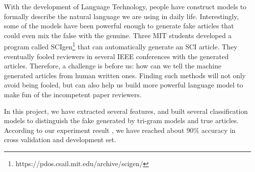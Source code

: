 With the development of Language Technology, people have construct models to formally describe the natural language we are using in daily life.
Interestingly, some of the models have been powerful enough to generate fake articles that could even mix the false with the genuine.
Three MIT students developed a program called SCIgen\footnote{https://pdos.csail.mit.edu/archive/scigen/} that can automatically
generate an SCI article. They eventually fooled reviewers in several IEEE conferences with the generated articles. Therefore, a challenge is before
us: how can we tell the machine generated articles from human written ones. Finding such methods will not only avoid being fooled, but
can also help us build more powerful language model to make fun of the incompetent paper reviewers. 

In this project, we have extracted several features, and built several classification models to distinguish the fake generated by tri-gram models and 
 true articles. According to our experiment result , we have reached about 90\% accuracy in cross validation and development set. 